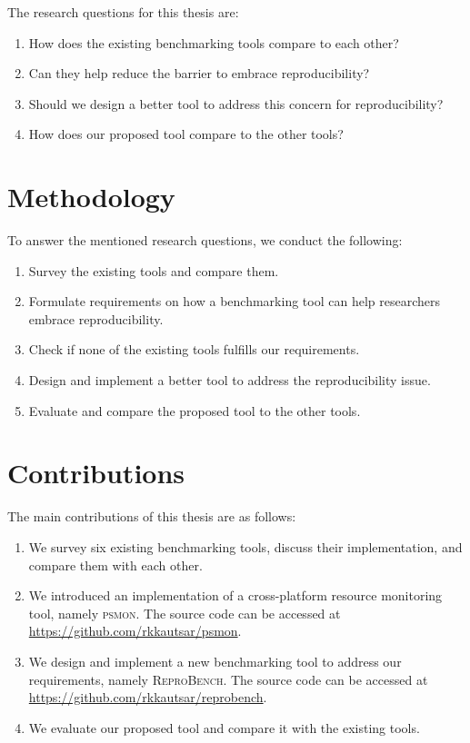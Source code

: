 The research questions for this thesis are:
\begin{enumerate}
	\item How does the existing benchmarking tools compare to each other?
	\item Can they help reduce the barrier to embrace reproducibility?
	\item Should we design a better tool to address this concern for reproducibility?
	\item How does our proposed tool compare to the other tools?
\end{enumerate}

\section{Methodology}
\label{sec:intro.method}

To answer the mentioned research questions, we conduct the following:
\begin{enumerate}
	\item Survey the existing tools and compare them.
	\item Formulate requirements on how a benchmarking tool can help researchers embrace reproducibility.
	\item Check if none of the existing tools fulfills our requirements.
	\item Design and implement a better tool to address the reproducibility issue.
	\item Evaluate and compare the proposed tool to the other tools.
\end{enumerate}

\section{Contributions}
\label{sec:intro.contributions}

The main contributions of this thesis are as follows:
\begin{enumerate}
	\item We survey six existing benchmarking tools, discuss their implementation, and compare them with each other.
	\item We introduced an implementation of a cross-platform resource monitoring tool, namely \textsc{psmon}. The source code can be accessed at \url{https://github.com/rkkautsar/psmon}.
	\item We design and implement a new benchmarking tool to address our requirements, namely \textsc{ReproBench}. The source code can be accessed at \url{https://github.com/rkkautsar/reprobench}.
	\item We evaluate our proposed tool and compare it with the existing tools.
\end{enumerate}


